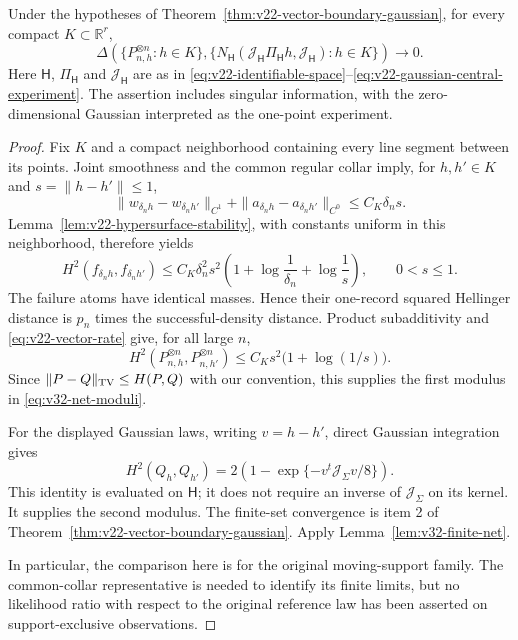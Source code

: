 \begin{theorem}
\label{thm:v32-compact-vector}
Under the hypotheses of Theorem~\ref{thm:v22-vector-boundary-gaussian},
for every compact \(K\subset\mathbb R^r\),
\begin{equation}\label{eq:v32-compact-vector-limit}
 \Delta\!\left(
   \{P_{n,h}^{\otimes n}:h\in K\},
   \{N_{\mathsf H}(\mathcal J_{\mathsf H}\Pi_{\mathsf H}h,
                    \mathcal J_{\mathsf H}):h\in K\}
          \right)\longrightarrow0.
\end{equation}
Here \(\mathsf H\), \(\Pi_{\mathsf H}\) and
\(\mathcal J_{\mathsf H}\) are as in
\eqref{eq:v22-identifiable-space}--\eqref{eq:v22-gaussian-central-experiment}.
The assertion includes singular information, with the zero-dimensional
Gaussian interpreted as the one-point experiment.
\end{theorem}

\begin{proof}
Fix \(K\) and a compact neighborhood containing every line segment between
its points.  Joint smoothness and the common regular collar imply, for
\(h,h'\in K\) and \(s=\|h-h'\|\le1\),
\[
 \|w_{\delta_nh}-w_{\delta_nh'}\|_{C^1}
   +\|a_{\delta_nh}-a_{\delta_nh'}\|_{C^0}
 \le C_K\delta_ns.
\]
Lemma~\ref{lem:v22-hypersurface-stability}, with constants uniform in this
neighborhood, therefore yields
\begin{equation}\label{eq:v32-local-H-modulus}
 H^2(f_{\delta_nh},f_{\delta_nh'})
 \le C_K\delta_n^2s^2
       \left(1+\log\frac1{\delta_n}+\log\frac1s\right),
 \qquad 0<s\le1.
\end{equation}
The failure atoms have identical masses.  Hence their one-record squared
Hellinger distance is \(p_n\) times the successful-density distance.
Product subadditivity and \eqref{eq:v22-vector-rate} give, for all large
\(n\),
\begin{equation}\label{eq:v32-product-H-modulus}
 H^2(P_{n,h}^{\otimes n},P_{n,h'}^{\otimes n})
 \le C_Ks^2\bigl(1+\log(1/s)\bigr).
\end{equation}
Since \(\|P-Q\|_{\rm TV}\le H(P,Q)\) with our convention, this supplies
the first modulus in \eqref{eq:v32-net-moduli}.

For the displayed Gaussian laws, writing \(v=h-h'\), direct Gaussian
integration gives
\[
 H^2(Q_h,Q_{h'})=2\left(1-\exp\{-v^t\mathcal J_\Sigma v/8\}\right).
\]
This identity is evaluated on \(\mathsf H\); it does not require an inverse
of \(\mathcal J_\Sigma\) on its kernel.  It supplies the second modulus.
The finite-set convergence is item 2 of
Theorem~\ref{thm:v22-vector-boundary-gaussian}.  Apply
Lemma~\ref{lem:v32-finite-net}.

In particular, the comparison here is for the original moving-support
family.  The common-collar representative is needed to identify its finite
limits, but no likelihood ratio with respect to the original reference law
has been asserted on support-exclusive observations.
\end{proof}

